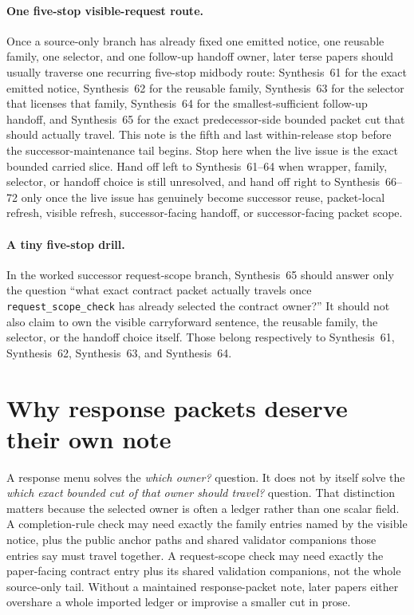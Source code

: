 \documentclass[11pt]{article}
\begin{document}
\paragraph{One five-stop visible-request route.}
Once a source-only branch has already fixed one emitted notice, one reusable family, one selector, and one follow-up handoff owner, later terse papers should usually traverse one recurring five-stop midbody route: Synthesis~61 for the exact emitted notice, Synthesis~62 for the reusable family, Synthesis~63 for the selector that licenses that family, Synthesis~64 for the smallest-sufficient follow-up handoff, and Synthesis~65 for the exact predecessor-side bounded packet cut that should actually travel. This note is the fifth and last within-release stop before the successor-maintenance tail begins. Stop here when the live issue is the exact bounded carried slice. Hand off left to Synthesis~61--64 when wrapper, family, selector, or handoff choice is still unresolved, and hand off right to Synthesis~66--72 only once the live issue has genuinely become successor reuse, packet-local refresh, visible refresh, successor-facing handoff, or successor-facing packet scope.

\paragraph{A tiny five-stop drill.}
In the worked successor request-scope branch, Synthesis~65 should answer only the question ``what exact contract packet actually travels once \nolinkurl{request_scope_check} has already selected the contract owner?'' It should not also claim to own the visible carryforward sentence, the reusable family, the selector, or the handoff choice itself. Those belong respectively to Synthesis~61, Synthesis~62, Synthesis~63, and Synthesis~64.

\section{Why response packets deserve their own note}
A response menu solves the \emph{which owner?} question.
It does not by itself solve the \emph{which exact bounded cut of that owner should travel?} question.
That distinction matters because the selected owner is often a ledger rather than one scalar field.
A completion-rule check may need exactly the family entries named by the visible notice, plus the public anchor paths and shared validator companions those entries say must travel together.
A request-scope check may need exactly the paper-facing contract entry plus its shared validation companions, not the whole source-only tail.
Without a maintained response-packet note, later papers either overshare a whole imported ledger or improvise a smaller cut in prose.
\end{document}
